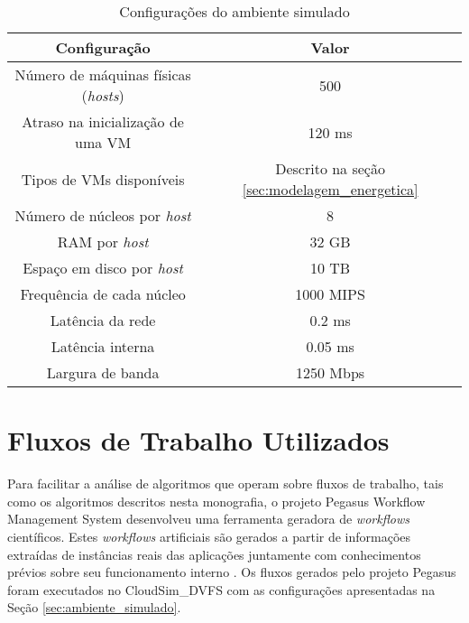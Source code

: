 \begin{table}
	\centering
    \begin{tabular}{c|c}
    \hline
    \textbf{Configuração}                     & \textbf{Valor}                                   \\ \hline
    Número de máquinas físicas (\emph{hosts}) & 500                                              \\
    Atraso na inicialização de uma VM         & 120 ms                                           \\
    Tipos de VMs disponíveis                  & Descrito na seção \ref{sec:modelagem_energetica} \\
    Número de núcleos por \emph{host}         & 8                                                \\
    RAM por \emph{host}                       & 32 GB                                            \\
    Espaço em disco por \emph{host}           & 10 TB                                            \\
    Frequência de cada núcleo                 & 1000 MIPS                                        \\
    Latência da rede                          & 0.2 ms                                           \\
    Latência interna                          & 0.05 ms                                          \\
    Largura de banda                          & 1250 Mbps                                        \\ \hline
    \end{tabular}
    \caption{Configurações do ambiente simulado}
    \label{tab:configuracoes_cloudsim_dvfs}
\end{table}


\section{Fluxos de Trabalho Utilizados}
\label{sec:fluxos_trabalho}

Para facilitar a análise de algoritmos que operam sobre fluxos de trabalho, tais
como os algoritmos descritos nesta monografia, o projeto Pegasus Workflow
Management System desenvolveu uma ferramenta geradora de \emph{workflows}
científicos. Estes \emph{workflows} artificiais são gerados a partir de
informações extraídas de instâncias reais das aplicações juntamente com
conhecimentos prévios sobre seu funcionamento interno
\cite{pegasus:workflowgenerator}. Os fluxos gerados pelo projeto Pegasus foram
executados no CloudSim\_DVFS com as configurações apresentadas na Seção
\ref{sec:ambiente_simulado}.


